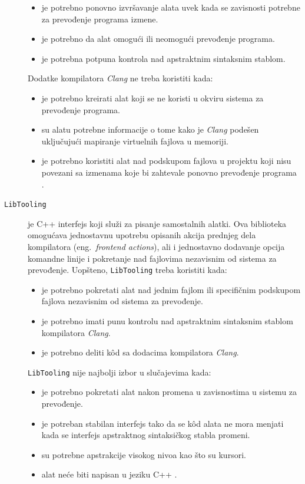 \documentclass[12pt,oneside]{memoir}
\begin{document}
\begin{description}
\begin{itemize}
\item je potrebno ponovno izvr\v{s}avanje alata uvek kada se zavisnosti potrebne za prevođenje programa izmene.
\item je potrebno da alat omogu\'{c}i ili neomogu\'{c}i prevođenje programa.
\item je potrebna potpuna kontrola nad apstraktnim sintaksnim stablom.
\end{itemize}
Dodatke kompilatora \textit{Clang} ne treba koristiti kada:
\begin{itemize}
\item je potrebno kreirati alat koji se ne koristi u okviru sistema za prevođenje programa.
\item su alatu potrebne informacije o tome kako je \textit{Clang} pode\v{s}en uklju\v{c}uju\'{c}i mapiranje virtuelnih fajlova u memoriji.
\item je potrebno koristiti alat nad podskupom fajlova u projektu koji nisu povezani sa izmenama koje bi zahtevale ponovno prevođenje programa \cite{RightInterface}.
\end{itemize}

\item[\texttt{LibTooling}] je C++ interfejs koji slu\v{z}i za pisanje samostalnih alatki. Ova biblioteka omogu\'{c}ava jednostavnu
upotrebu opisanih akcija prednjeg dela kompilatora (eng.~\textit{frontend actions}), ali i jednostavno dodavanje opcija komandne linije i pokretanje nad fajlovima 
nezavisnim od sistema za prevođenje. 
Uop\v{s}teno, \texttt{LibTooling} treba koristiti kada:
\begin{itemize}
  \item je potrebno pokretati alat nad jednim fajlom ili specifi\v{c}nim podskupom fajlova nezavisnim od sistema za prevođenje.
  \item je potrebno imati punu kontrolu nad apstraktnim sintaksnim stablom kompilatora \textit{Clang}.
  \item je potrebno deliti k\^{o}d sa dodacima kompilatora \textit{Clang}.
\end{itemize}
\texttt{LibTooling} nije najbolji izbor u slu\v{c}ajevima kada:
\begin{itemize}
  \item je potrebno pokretati alat nakon promena u zavisnostima u sistemu za prevođenje.
  \item je potreban stabilan interfejs tako da se k\^{o}d alata ne mora menjati kada se interfejs apstraktnog sintaksi\v{c}kog stabla promeni.
  \item su potrebne apstrakcije visokog nivoa kao \v{s}to su kursori.
  \item alat ne\'{c}e biti napisan u jeziku C++ \cite{RightInterface}.
\end{itemize}
\end{description}
\end{document}
